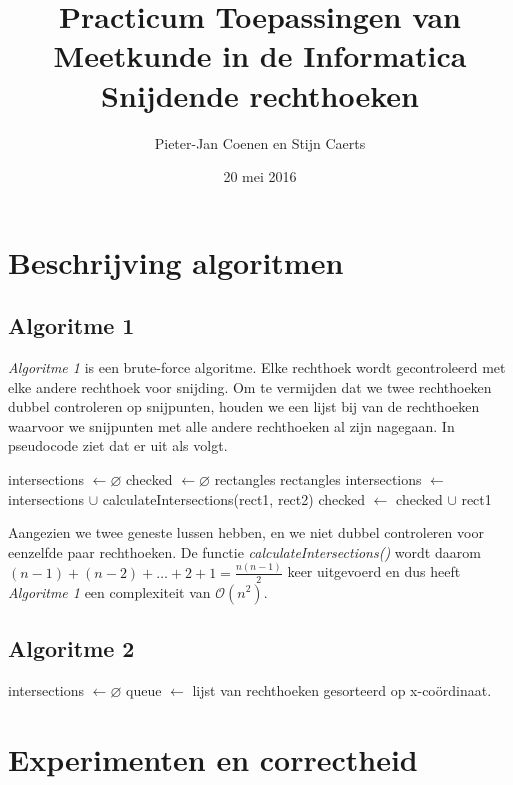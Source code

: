 \documentclass[11pt,a4paper,titlepage]{article}
\author{Pieter-Jan Coenen en Stijn Caerts}
\title{Practicum Toepassingen van Meetkunde in de Informatica \\ Snijdende rechthoeken}
\date{20 mei 2016}
\begin{document}
	\maketitle
	\tableofcontents
	\newpage
	\section{Beschrijving algoritmen}
	\subsection{Algoritme 1}
	\emph{Algoritme 1} is een brute-force algoritme. Elke rechthoek wordt gecontroleerd met elke andere rechthoek voor snijding. Om te vermijden dat we twee rechthoeken dubbel controleren op snijpunten, houden we een lijst bij van de rechthoeken waarvoor we snijpunten met alle andere rechthoeken al zijn nagegaan. In pseudocode ziet dat er uit als volgt.
	\begin{algorithm}[H]
		\caption{}
		\begin{algorithmic}[1]
			\State intersections $\gets \varnothing $
			\State checked $\gets \varnothing $
			 {rectangles}
				 {rectangles}
						\State intersections $ \gets $ intersections $ \cup $ calculateIntersections(rect1, rect2)
					\EndIf
				\EndForEach
				\State checked $\gets$ checked $\cup$ rect1
			\EndForEach
		\end{algorithmic}
	\end{algorithm}
	Aangezien we twee geneste lussen hebben, en we niet dubbel controleren voor eenzelfde paar rechthoeken. De functie \emph{calculateIntersections()} wordt daarom $ (n-1) + (n-2) + \dots + 2 + 1 = \frac{n(n-1)}{2} $ keer uitgevoerd en dus heeft \emph{Algoritme 1} een complexiteit van $\mathcal{O}(n^2)$.
	
	\subsection{Algoritme 2}
	\begin{algorithm}[H]
		\caption{}
		\begin{algorithmic}[1]
			\State intersections $\gets \varnothing $
			\State queue $\gets$ lijst van rechthoeken gesorteerd op x-coördinaat.
		\end{algorithmic}
	\end{algorithm}
	\section{Experimenten en correctheid}
\end{document}
